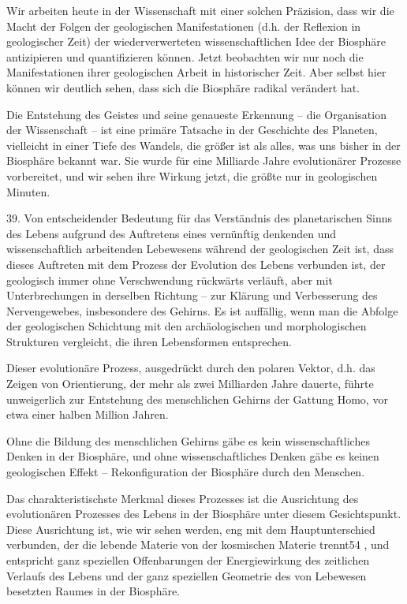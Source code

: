 \documentclass[11pt,a4paper]{book}
\begin{document}
Wir arbeiten heute in der Wissenschaft mit einer solchen Präzision, dass wir die Macht der Folgen der geologischen Manifestationen (d.h. der Reflexion in geologischer Zeit) der wiederverwerteten wissenschaftlichen Idee der Biosphäre antizipieren und quantifizieren können. Jetzt beobachten wir nur noch die Manifestationen ihrer geologischen Arbeit in historischer Zeit. Aber selbst hier können wir deutlich sehen, dass sich die Biosphäre radikal verändert hat. 

Die Entstehung des Geistes und seine genaueste Erkennung -- die Organisation der Wissenschaft -- ist eine primäre Tatsache in der Geschichte des Planeten, vielleicht in einer Tiefe des Wandels, die größer ist als alles, was uns bisher in der Biosphäre bekannt war. Sie wurde für eine Milliarde Jahre evolutionärer Prozesse vorbereitet, und wir sehen ihre Wirkung jetzt, die größte nur in geologischen Minuten. 

39. Von entscheidender Bedeutung für das Verständnis des planetarischen Sinns des Lebens aufgrund des Auftretens eines vernünftig denkenden und wissenschaftlich arbeitenden Lebewesens während der geologischen Zeit ist, dass dieses Auftreten mit dem Prozess der Evolution des Lebens verbunden ist, der geologisch immer ohne Verschwendung rückwärts verläuft, aber mit Unterbrechungen in derselben Richtung -- zur Klärung und Verbesserung des Nervengewebes, insbesondere des Gehirns. Es ist auffällig, wenn man die Abfolge der geologischen Schichtung mit den archäologischen und morphologischen Strukturen vergleicht, die ihren Lebensformen entsprechen. 

Dieser evolutionäre Prozess, ausgedrückt durch den polaren Vektor, d.h. das Zeigen von Orientierung, der mehr als zwei Milliarden Jahre dauerte, führte unweigerlich zur Entstehung des menschlichen Gehirns der Gattung Homo, vor etwa einer halben Million Jahren. 

Ohne die Bildung des menschlichen Gehirns gäbe es kein wissenschaftliches Denken in der Biosphäre, und ohne wissenschaftliches Denken gäbe es keinen geologischen Effekt -- Rekonfiguration der Biosphäre durch den Menschen. 

Das charakteristischste Merkmal dieses Prozesses ist die Ausrichtung des evolutionären Prozesses des Lebens in der Biosphäre unter diesem Gesichtspunkt. Diese Ausrichtung ist, wie wir sehen werden, eng mit dem Hauptunterschied verbunden, der die lebende Materie von der kosmischen Materie trennt54 , und entspricht ganz speziellen Offenbarungen der Energiewirkung des zeitlichen Verlaufs des Lebens und der ganz speziellen Geometrie des von Lebewesen besetzten Raumes in der Biosphäre. 
\end{document}
